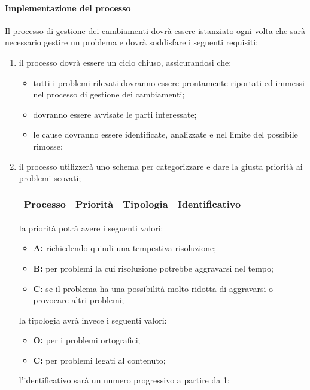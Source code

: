 		\paragraph{Implementazione del processo}
			Il processo di gestione dei cambiamenti dovrà essere istanziato ogni volta che sarà necessario gestire un problema e dovrà soddisfare i seguenti requisiti:
			\begin{enumerate}
				\item il processo dovrà essere un ciclo chiuso, assicurandosi che:
					\begin{itemize}
				 		\item tutti i problemi rilevati dovranno essere prontamente riportati ed immessi nel processo di gestione dei cambiamenti;
					 	\item dovranno essere avvisate le parti interessate;
				 		\item le cause dovranno essere identificate, analizzate e nel limite del possibile rimosse;
					 \end{itemize}

				\item il processo utilizzerà uno schema per categorizzare e dare la giusta priorità ai problemi scovati;

					\begin{center}
						\begin{longtable}{|c|c|c|c|}
							\hline
							\rowcolor{lighter-grayer}
							\textbf{Processo} & \textbf{Priorità} & \textbf{Tipologia} & \textbf{Identificativo}\\
							\hline
							\endfirsthead
							\hline

						\end{longtable}
					\end{center}

				 la priorità potrà avere i seguenti valori:
					\begin{itemize}
					 	\item \textbf{A:} richiedendo quindi una tempestiva risoluzione;
					 	\item \textbf{B:} per problemi la cui risoluzione potrebbe aggravarsi nel tempo;
					 	\item \textbf{C:} se il problema ha una possibilità molto ridotta di aggravarsi o provocare altri problemi;
					 \end{itemize}
				 la tipologia avrà invece i seguenti valori:
					\begin{itemize}
						\item \textbf{O:} per i problemi ortografici;
						\item \textbf{C:} per problemi legati al contenuto;
					\end{itemize}
				 l'identificativo sarà un numero progressivo a partire da 1;


\end{enumerate}
